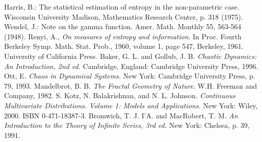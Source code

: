 \begin{thebibliography}{99}
\vskip12pt
\label{bib:Harris} Harris, B.: The statistical estimation of entropy in the non-parametric case. Wisconsin University Madison, Mathematics Research Center, p. 318 (1975).
\label{bib:Wendel} Wendel, J.: Note on the gamma function. Amer. Math. Monthly 55, 563-564 (1948).
\label{bib:Renyi} Renyi, A., \textit{On measures of entropy and information}. In Proc. Fourth Berkeley Symp. Math. Stat. Prob., 1960, volume 1, page 547, Berkeley, 1961. University of California Press.
\label{bib:Capacity dimension} Baker, G. L. and Gollub, J. B. \textit{Chaotic Dynamics: An Introduction, 2nd ed.} Cambridge, England: Cambridge University Press, 1996.
\label{bib:Information dimension} Ott, E. \textit{Chaos in Dynamical Systems.} New York: Cambridge University Press, p. 79, 1993.
\label{bib:Box counting} Mandelbrot, B. B. \textit{The Fractal Geometry of Nature}. W.H. Freeman and Company, 1982.
\label{bib:Multinomial Dirichlet} S. Kotz, N. Balakrishnan, and N. L. Johnson. \textit{Continuous Multivariate Distributions. Volume 1: Models and Applications.} New York: Wiley, 2000. ISBN 0-471-18387-3.
\label{bib:Raabe} Bromwich, T. J. I'A. and MacRobert, T. M. \textit{An Introduction to the Theory of Infinite Series, 3rd ed.} New York: Chelsea, p. 39, 1991.
\end{thebibliography}